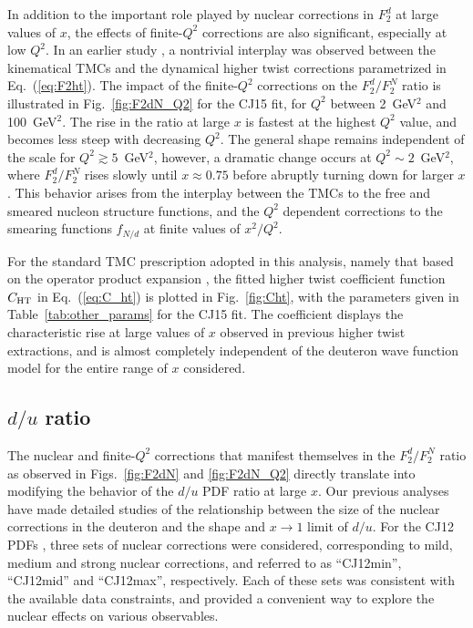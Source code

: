 \documentclass[aps,prd,amsmath,preprint]{revtex4}
\begin{document}
In addition to the important role played by nuclear corrections
in $F_2^d$ at large values of $x$, the effects of finite-$Q^2$
corrections are also significant, especially at low $Q^2$.
In an earlier study \cite{CJ10}, a nontrivial interplay was
observed between the kinematical TMCs and the dynamical higher
twist corrections parametrized in Eq.~(\ref{eq:F2ht}).
The impact of the finite-$Q^2$ corrections on the $F_2^d/F_2^N$
ratio is illustrated in Fig.~\ref{fig:F2dN_Q2} for the CJ15
fit, for $Q^2$ between 2~GeV$^2$ and 100~GeV$^2$.
The rise in the ratio at large $x$ is fastest at the highest
$Q^2$ value, and becomes less steep with decreasing $Q^2$.
The general shape remains independent of the scale for
$Q^2 \gtrsim 5$~GeV$^2$, however, a dramatic change occurs at
$Q^2 \sim 2$~GeV$^2$, where $F_2^d/F_2^N$ rises slowly until
$x \approx 0.75$ before abruptly turning down for larger $x$.
This behavior arises from the interplay between the TMCs to
the free and smeared nucleon structure functions, and the
$Q^2$ dependent corrections to the smearing functions $f_{N/d}$
at finite values of $x^2/Q^2$.


For the standard TMC prescription adopted in this analysis,
namely that based on the operator product expansion \cite{GP76},
the fitted higher twist coefficient function $C_{\rm HT}$
in Eq.~(\ref{eq:C_ht}) is plotted in Fig.~\ref{fig:Cht},
with the parameters given in Table~\ref{tab:other_params}
for the CJ15 fit.
The coefficient displays the characteristic rise at large values
of $x$ observed in previous higher twist extractions, and is
almost completely independent of the deuteron wave function
model for the entire range of $x$ considered.


\subsection{$d/u$ ratio}
\label{ssec:du}


The nuclear and finite-$Q^2$ corrections that manifest themselves
in the $F_2^d/F_2^N$ ratio as observed in Figs.~\ref{fig:F2dN} and
\ref{fig:F2dN_Q2} directly translate into modifying the behavior
of the $d/u$ PDF ratio at large $x$.  Our previous analyses
\cite{CJ10, CJ11, CJ12} have made detailed studies of the
relationship between the size of the nuclear corrections in
the deuteron and the shape and $x \to 1$ limit of $d/u$.
For the CJ12 PDFs \cite{CJ12}, three sets of nuclear corrections
were considered, corresponding to mild, medium and strong nuclear
corrections, and referred to as ``CJ12min'', ``CJ12mid'' and
``CJ12max'', respectively.  Each of these sets was consistent
with the available data constraints, and provided a convenient
way to explore the nuclear effects on various observables.
\end{document}

